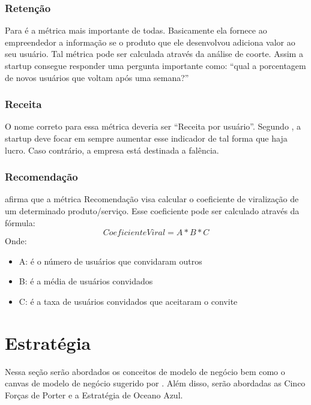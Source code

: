 \subsubsection{Retenção}
\label{cha:retencao}
Para  é a métrica mais importante de todas. Basicamente ela fornece ao empreendedor a informação se o produto que ele desenvolvou adiciona valor ao seu usuário. Tal métrica pode ser calculada através da análise de coorte. Assim a startup consegue responder uma pergunta importante como: \enquote{qual a porcentagem de novos usuários que voltam após uma semana?}

\subsubsection{Receita}
\label{cha:receita}
O nome correto para essa métrica deveria ser \enquote{Receita por usuário}. Segundo , a startup deve focar em sempre aumentar esse indicador de tal forma que haja lucro. Caso contrário, a empresa está destinada a falência.

\subsubsection{Recomendação}
\label{cha:recomendacao}
 afirma que a métrica Recomendação visa calcular o coeficiente de viralização de um determinado produto/serviço. Esse coeficiente pode ser calculado através da fórmula: 
\begin{equation}
CoeficienteViral = A * B * C
\end{equation}
Onde:
\begin{itemize}
\item A: é o número de usuários que convidaram outros
\item B: é a média de usuários convidados
\item C: é a taxa de usuários convidados que aceitaram o convite
\end{itemize}

\section{Estratégia}
\label{cha:estrategia}
Nessa seção serão abordados os conceitos de modelo de negócio bem como o canvas de modelo de negócio sugerido por . Além disso, serão abordadas as Cinco Forças de Porter e a Estratégia de Oceano Azul.

